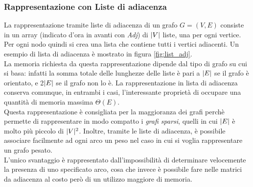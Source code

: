 \subsubsection{Rappresentazione con Liste di adiacenza}
La rappresentazione tramite liste di adiacenza di un grafo $G = (V, E)$ consiste in  un array (indicato d'ora in avanti con \textit{Adj}) di $\arrowvert V\arrowvert$ liste, una per ogni vertice. Per ogni nodo quindi si crea una lista che contiene tutti i vertici adiacenti. Un esempio di lista di adiacenza è mostrato in figura \ref{fig:list_adj}.\\
La memoria richiesta da questa rappresentazione dipende dal tipo di grafo su cui si basa: infatti la somma totale delle lunghezze delle liste è pari a $\arrowvert E\arrowvert$ se il grafo è orientato, e 2$\arrowvert E\arrowvert$ se il grafo non lo è. La rappresentazione in lista di adiacenza conserva comunque, in entrambi i casi, l'interessante proprietà di occupare una quantità di memoria massima $\Theta(E)$.\\
Questa rappresentazione è consigliata per la maggioranza dei grafi perchè permette di rappresentare in modo compatto i \emph{grafi sparsi}, quelli in cui $\arrowvert E\arrowvert$ è molto più piccolo di $\arrowvert V\arrowvert ^2$. Inoltre, tramite le liste di adiacenza, è possibile associare facilmente ad ogni arco un peso nel caso in cui si voglia rappresentare un grafo pesato.\\
L'unico svantaggio è rappresentato dall'impossibilità di determinare velocemente la presenza di uno specificato arco, cosa che invece è possibile fare nelle matrici da adiacenza al costo però di un utilizzo maggiore di memoria.
